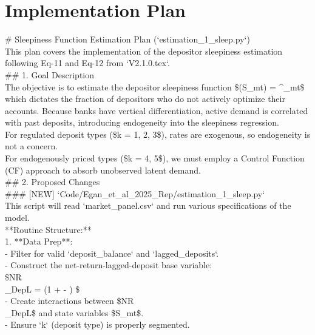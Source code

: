 \documentclass{article}
\begin{document}
\section*{Implementation Plan}
\# Sleepiness Function Estimation Plan (`estimation\_1\_sleep.py`) \\



This plan covers the implementation of the depositor sleepiness estimation following Eq-11 and Eq-12 from `V2.1.0.tex`. \\



\#\# 1. Goal Description \\



The objective is to estimate the depositor sleepiness function \$\phi(S\_{mt}) = \boldsymbol{\Upsilon}^\prime{}\_{mt}\$ which dictates the fraction of depositors who do not actively optimize their accounts. Because banks have vertical differentiation, active demand is correlated with past deposits, introducing endogeneity into the sleepiness regression. \\



For regulated deposit types (\$k = 1, 2, 3\$), rates are exogenous, so endogeneity is not a concern. \\
For endogenously priced types (\$k = 4, 5\$), we must employ a Control Function (CF) approach to absorb unobserved latent demand. \\



\#\# 2. Proposed Changes \\



\#\#\# [NEW] `Code/Egan\_et\_al\_2025\_Rep/estimation\_1\_sleep.py` \\



This script will read `market\_panel.csv` and run various specifications of the model. \\



**Routine Structure:** \\
1. **Data Prep**: \\
   - Filter for valid `deposit\_balance` and `lagged\_deposits`. \\
   - Construct the net-return-lagged-deposit base variable:  \\
     \$NR\\_DepL = (1 +  - ) \times {}\$ \\
   - Create interactions between \$NR\\_DepL\$ and state variables \$S\_{mt}\$. \\
   - Ensure `k` (deposit type) is properly segmented. \\
\end{document}
